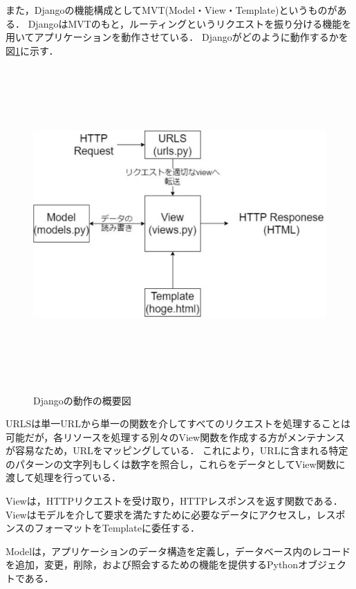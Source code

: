\newpage
また，Djangoの機能構成としてMVT(Model・View・Template)というものがある．
DjangoはMVTのもと，ルーティングというリクエストを振り分ける機能を用いてアプリケーションを動作させている．
Djangoがどのように動作するかを図\ref{django_work}に示す．

\begin{figure}[htbp]
    \begin{center}
        \includegraphics[width=13cm,height=12cm,keepaspectratio]{django_work-crop.pdf}\\
    \end{center}
    \caption{Djangoの動作の概要図}
    \label{django_work}
\end{figure}

URLSは単一URLから単一の関数を介してすべてのリクエストを処理することは可能だが，各リソースを処理する別々のView関数を作成する方がメンテナンスが容易なため，URLをマッピングしている．
これにより，URLに含まれる特定のパターンの文字列もしくは数字を照合し，これらをデータとしてView関数に渡して処理を行っている．

Viewは，HTTPリクエストを受け取り，HTTPレスポンスを返す関数である．
Viewはモデルを介して要求を満たすために必要なデータにアクセスし，レスポンスのフォーマットをTemplateに委任する．

Modelは，アプリケーションのデータ構造を定義し，データベース内のレコードを追加，変更，削除，および照会するための機能を提供するPythonオブジェクトである．

